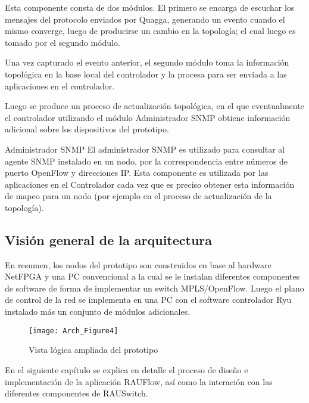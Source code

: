 Esta componente consta de dos módulos. El primero se encarga de escuchar los mensajes del protocolo enviados por Quagga, generando un evento cuando el mismo converge, luego de producirse un cambio en la topolog\'ia; el cual luego es tomado por el segundo m\'odulo.

Una vez capturado el evento anterior, el segundo m\'odulo toma la información topol\'ogica en la base local del controlador y la procesa para ser enviada a las aplicaciones en el controlador.

Luego se produce un proceso de actualizaci\'on topol\'ogica, en el que eventualmente el controlador utilizando el m\'odulo Administrador SNMP obtiene informaci\'on adicional sobre los dispositivos del prototipo. 

\begin{subsection}{Administrador SNMP}
El administrador SNMP es utilizado para consultar al agente SNMP instalado en un nodo, por la correspondencia entre números de puerto OpenFlow y direcciones IP. Esta componente es utilizada por las aplicaciones en el Controlador cada vez que es preciso obtener esta información de mapeo para un nodo (por ejemplo en el proceso de actualización de la topolog\'ia).

\end{subsection}

\subsection{Visi\'on general de la arquitectura}

En resumen, los nodos del prototipo son construidos en base al hardware NetFPGA y una PC convencional a la cual se le instalan diferentes componentes de software de forma de implementar un switch MPLS/OpenFlow. Luego el plano de control de la red se implementa en una PC con el software controlador Ryu instalado m\'as un conjunto de m\'odulos adicionales.


\begin{figure}[h] 
\centering    
\texttt{[image: Arch\_Figure4]}
\caption[Vista l\'ogica ampliada del prototipo]{Vista l\'ogica ampliada del prototipo}
\label{fig:OpenSourceRArch4}
\end{figure}

En el siguiente cap\'itulo se explica en detalle el proceso de diseño e implementaci\'on de la aplicaci\'on RAUFlow, as\'i como la interaci\'on con las diferentes componentes de RAUSwitch.
